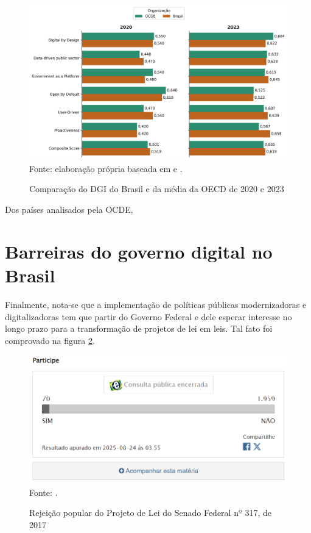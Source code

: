 \begin{figure}[H]
	\centering
	\caption{Comparação do DGI do Brasil e da média da OECD de 2020 e 2023}
	\includegraphics[width=1\linewidth]{figuras/comparacao_dgi_brasil_mundo_2020_2023}
	\label{fig:comparacao_dgi_brasil_mundo_2020_2023}
	\footnotesize{Fonte: elaboração própria baseada em \cite{dgi_2020} e \cite{dgi_2023}.}
\end{figure}

Dos países analisados pela OCDE, 

\section{Barreiras do governo digital no Brasil}

Finalmente, nota-se que a implementação de políticas públicas modernizadoras e digitalizadoras tem que partir do Governo Federal e dele esperar interesse no longo prazo para a transformação de projetos de lei em leis. Tal fato foi comprovado na figura \ref{fig:participacao_votacao_popular_lgd}.

\begin{figure}[H]
	\centering
	\caption{Rejeição popular do Projeto de Lei do Senado Federal nº 317, de 2017}
	\includegraphics[width=1\linewidth]{figuras/participacao_votacao_popular_lgd}
	\label{fig:participacao_votacao_popular_lgd}
	\footnotesize{Fonte: \cite{pls_317_2021}.}
\end{figure}

